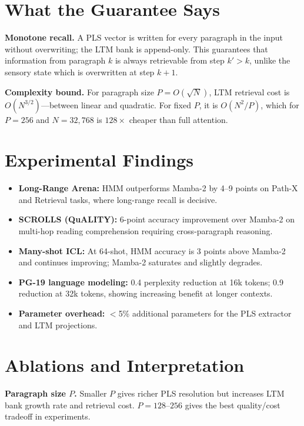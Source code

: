\documentclass[10pt,twocolumn]{article}
\begin{document}
\section{What the Guarantee Says}

\textbf{Monotone recall.} A PLS vector is written for every paragraph in the input
without overwriting; the LTM bank is append-only. This guarantees that information
from paragraph $k$ is always retrievable from step $k' > k$, unlike the sensory
state which is overwritten at step $k+1$.

\textbf{Complexity bound.} For paragraph size $P = O(\sqrt{N})$, LTM retrieval cost
is $O(N^{3/2})$---between linear and quadratic. For fixed $P$, it is $O(N^2/P)$,
which for $P = 256$ and $N = 32{,}768$ is $128\times$ cheaper than full attention.

\section{Experimental Findings}

\begin{itemize}[itemsep=2pt,parsep=0pt]
  \item \textbf{Long-Range Arena:} HMM outperforms Mamba-2 by 4--9 points on Path-X
    and Retrieval tasks, where long-range recall is decisive.
  \item \textbf{SCROLLS (QuALITY):} 6-point accuracy improvement over Mamba-2 on
    multi-hop reading comprehension requiring cross-paragraph reasoning.
  \item \textbf{Many-shot ICL:} At 64-shot, HMM accuracy is 3 points above Mamba-2
    and continues improving; Mamba-2 saturates and slightly degrades.
  \item \textbf{PG-19 language modeling:} 0.4 perplexity reduction at 16k tokens;
    0.9 reduction at 32k tokens, showing increasing benefit at longer contexts.
  \item \textbf{Parameter overhead:} $<$5\% additional parameters for the PLS
    extractor and LTM projections.
\end{itemize}

\section{Ablations and Interpretation}

\textbf{Paragraph size $P$.} Smaller $P$ gives richer PLS resolution but increases
LTM bank growth rate and retrieval cost. $P = 128$--$256$ gives the best quality/cost
tradeoff in experiments.
\end{document}
